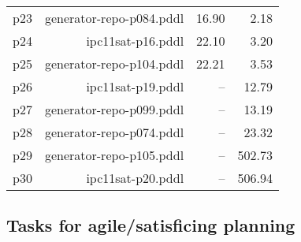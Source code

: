 \documentclass{article}
\begin{document}
\begin{center}
\begin{tabular}{@{}l|r|r|r@{}}
  p23& generator-repo-p084.pddl&16.90&2.18\\
  p24& ipc11sat-p16.pddl&22.10&3.20\\
  p25& generator-repo-p104.pddl&22.21&3.53\\
  p26& ipc11sat-p19.pddl&--&12.79\\
  p27& generator-repo-p099.pddl&--&13.19\\
  p28& generator-repo-p074.pddl&--&23.32\\
  p29& generator-repo-p105.pddl&--&502.73\\
  p30& ipc11sat-p20.pddl&--&506.94
                            \end{tabular}
                            \end{center}
                    

                    \subsection*{Tasks for agile/satisficing planning}
                    
\end{document}
